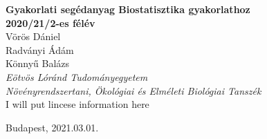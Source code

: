 \begin{titlepage}
\begin{flushright}
\Huge{\textbf{Gyakorlati segédanyag Biostatisztika gyakorlathoz}}\\
\vfill 
\Large{\textbf{2020/21/2-es félév}}\\
    \vfill
    \normalsize Vörös Dániel\\
     Radványi Ádám\\
     Könnyű Balázs\\
     \textit{Eötvös Lóránd Tudományegyetem}\\
     \textit{Növényrendszertani, Ökológiai és Elméleti Biológiai Tanszék}\\
\vfill
\normalsize I will put lincese information here
\vfill

\footnotesize Budapest, 2021.03.01.\\ 

\end{flushright}
\end{titlepage} 
